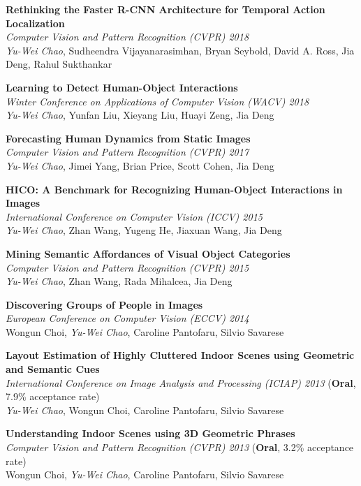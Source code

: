 \documentclass[10pt]{article}
\makeatletter
\newlength{\bibhang}
\newlength{\bibsep}
 {\@listi \global\bibsep\itemsep \global\advance\bibsep by\parsep}
\newenvironment{bibsection}%
        {\begin{list}{}{%
        \setlength{\leftmargin}{0em}
       \setlength{\itemsep}{\bibsep}%
       \setlength{\parsep}{\z@}%
        \setlength{\partopsep}{0pt}%
        \setlength{\topsep}{0pt}}}
        {\end{list}\vspace{-.6\baselineskip}}           %
\makeatother
\begin{document}
\begin{bibsection}
\item[] \textbf{Rethinking the Faster R-CNN Architecture for Temporal Action Localization}\\ \emph{Computer Vision and Pattern Recognition (CVPR) 2018}\\ \emph{Yu-Wei Chao}, Sudheendra Vijayanarasimhan, Bryan Seybold, David A. Ross, Jia Deng, Rahul Sukthankar
\item[] \textbf{Learning to Detect Human-Object Interactions}\\ \emph{Winter Conference on Applications of Computer Vision (WACV) 2018}\\ \emph{Yu-Wei Chao}, Yunfan Liu, Xieyang Liu, Huayi Zeng, Jia Deng
\item[] \textbf{Forecasting Human Dynamics from Static Images}\\ \emph{Computer Vision and Pattern Recognition (CVPR) 2017}\\ \emph{Yu-Wei Chao}, Jimei Yang, Brian Price, Scott Cohen, Jia Deng
\item[] \textbf{HICO: A Benchmark for Recognizing Human-Object Interactions in Images}\\ \emph{International Conference on Computer Vision (ICCV) 2015}\\ \emph{Yu-Wei Chao}, Zhan Wang, Yugeng He, Jiaxuan Wang, Jia Deng
\item[] \textbf{Mining Semantic Affordances of Visual Object Categories}\\ \emph{Computer Vision and Pattern Recognition (CVPR) 2015}\\ \emph{Yu-Wei Chao}, Zhan Wang, Rada Mihalcea, Jia Deng
\item[] \textbf{Discovering Groups of People in Images}\\ \emph{European Conference on Computer Vision (ECCV) 2014}\\ Wongun Choi, \emph{Yu-Wei Chao}, Caroline Pantofaru, Silvio Savarese
\item[] \textbf{Layout Estimation of Highly Cluttered Indoor Scenes using Geometric and Semantic Cues}\\ \emph{International Conference on Image Analysis and Processing (ICIAP) 2013} (\textbf{Oral}, 7.9\% acceptance rate)\\ \emph{Yu-Wei Chao}, Wongun Choi, Caroline Pantofaru, Silvio Savarese
\item[] \textbf{Understanding Indoor Scenes using 3D Geometric Phrases}\\ \emph{Computer Vision and Pattern Recognition (CVPR) 2013} (\textbf{Oral}, 3.2\% acceptance rate)\\ Wongun Choi, \emph{Yu-Wei Chao}, Caroline Pantofaru, Silvio Savarese

\end{bibsection}
\end{document}
